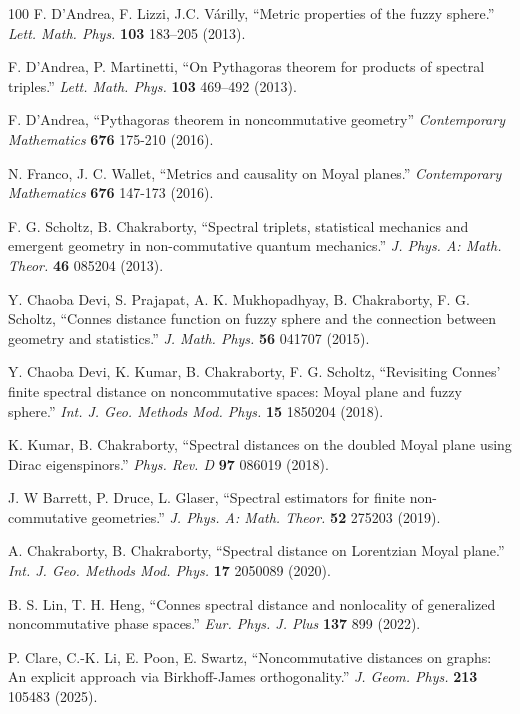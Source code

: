 \documentclass[a4paper,12pt]{article}
\begin{document}
\begin{thebibliography}{100}
 F. D’Andrea, F. Lizzi, J.C. V\'{a}rilly, ``Metric properties of the fuzzy sphere.'' {\it Lett. Math. Phys.} {\bf 103} 183–205 (2013).

 F. D'Andrea, P. Martinetti, ``On Pythagoras theorem for products of spectral triples.'' {\it Lett. Math. Phys.} {\bf 103} 469–492 (2013).

 F. D'Andrea, ``Pythagoras theorem in noncommutative geometry'' {\it Contemporary Mathematics} {\bf 676} 175-210 (2016).

 N. Franco, J. C. Wallet, ``Metrics and causality on Moyal planes.'' {\it Contemporary Mathematics} {\bf 676} 147-173 (2016).

 F. G. Scholtz, B. Chakraborty, ``Spectral triplets, statistical mechanics and emergent geometry in non-commutative quantum mechanics.'' {\it J. Phys. A: Math. Theor.} {\bf 46} 085204 (2013).

 Y. Chaoba Devi, S. Prajapat, A. K. Mukhopadhyay, B. Chakraborty, F. G. Scholtz, ``Connes distance function on fuzzy sphere and the connection between geometry and statistics.'' {\it J. Math. Phys.} {\bf 56} 041707 (2015).

 Y. Chaoba Devi, K. Kumar, B. Chakraborty, F. G. Scholtz, ``Revisiting Connes’ finite spectral distance on noncommutative spaces: Moyal plane and fuzzy sphere.'' {\it Int. J. Geo. Methods Mod. Phys.} {\bf 15} 1850204 (2018).

 K. Kumar, B. Chakraborty, ``Spectral distances on the doubled Moyal plane using Dirac eigenspinors.'' {\it Phys. Rev. D} {\bf 97} 086019 (2018).

 J. W Barrett, P. Druce, L. Glaser, ``Spectral estimators for finite non-commutative geometries.'' {\it J. Phys. A: Math. Theor.} {\bf 52} 275203 (2019).

 A. Chakraborty, B. Chakraborty, ``Spectral distance on Lorentzian Moyal plane.'' {\it Int. J. Geo. Methods Mod. Phys.} {\bf 17} 2050089 (2020).

 B. S. Lin, T. H. Heng, ``Connes spectral distance and nonlocality of generalized noncommutative phase spaces.'' {\it Eur. Phys. J. Plus} {\bf 137} 899 (2022).

 P. Clare, C.-K. Li, E. Poon, E. Swartz, ``Noncommutative distances on graphs: An explicit approach via Birkhoff-James orthogonality.'' {\it J. Geom. Phys.} {\bf 213} 105483 (2025).


\end{thebibliography}
\end{document}
